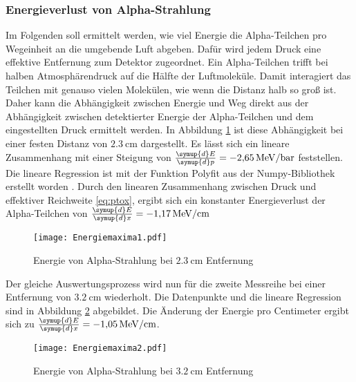 \subsubsection{Energieverlust von Alpha-Strahlung}
Im Folgenden soll ermittelt werden, wie viel Energie die Alpha-Teilchen pro Wegeinheit
an die umgebende Luft abgeben. Dafür wird jedem Druck eine effektive Entfernung zum Detektor zugeordnet.
Ein Alpha-Teilchen trifft bei halben Atmosphärendruck auf die Hälfte der Luftmoleküle. Damit interagiert
das Teilchen mit genauso vielen Molekülen, wie wenn die Distanz halb so groß ist.
Daher kann die Abhängigkeit zwischen Energie und Weg direkt aus der Abhängigkeit zwischen detektierter Energie
der Alpha-Teilchen und dem eingestellten Druck ermittelt werden.
In Abbildung \ref{fig:Energie1} ist diese Abhängigkeit bei einer festen Distanz von $\qty{2.3}{\centi\meter}$ 
dargestellt. Es lässt sich ein lineare Zusammenhang mit einer Steigung von $\frac{\symup{d}E}{\symup{d}p}=\qty{-2.65}{\mega\electronvolt\per\bar}$
feststellen. Die lineare Regression ist mit der Funktion Polyfit aus der Numpy-Bibliothek erstellt worden \cite{numpy}.
Durch den linearen Zusammenhang zwischen Druck und effektiver Reichweite \eqref{eq:ptox}, ergibt sich ein konstanter Energieverlust der Alpha-Teilchen
von $\frac{\symup{d}E}{\symup{d}x}=\qty{-1.17}{\mega\electronvolt\per\centi\meter}$
\begin{figure}[H]
  \centering
  \texttt{[image: Energiemaxima1.pdf]}
  \caption{Energie von Alpha-Strahlung bei $\qty{2.3}{\centi\meter}$ Entfernung}
  \label{fig:Energie1}
\end{figure}
\noindent Der gleiche Auswertungsprozess wird nun für die zweite Messreihe bei einer Entfernung von $\qty{3.2}{\centi\meter}$
wiederholt. Die Datenpunkte und die lineare Regression sind in Abbildung \ref{fig:Energie2} abgebildet.
Die Änderung der Energie pro Centimeter ergibt sich zu $\frac{\symup{d}E}{\symup{d}x}=\qty{-1.05}{\mega\electronvolt\per\centi\meter}$.
\begin{figure}[H]
  \centering
  \texttt{[image: Energiemaxima2.pdf]}
  \caption{Energie von Alpha-Strahlung bei $\qty{3.2}{\centi\meter}$ Entfernung}
  \label{fig:Energie2}
\end{figure}

